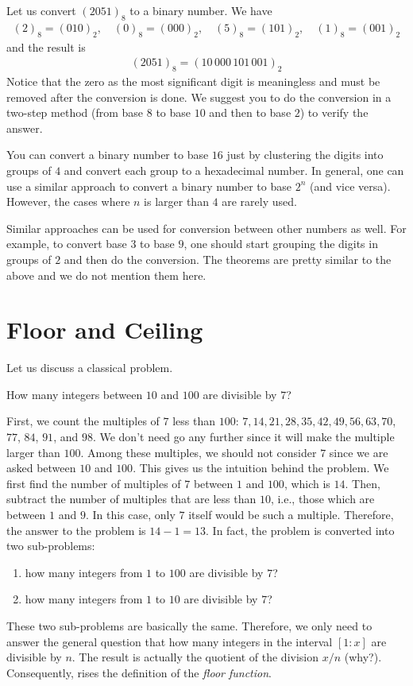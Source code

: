 \documentclass{subfile}
\begin{document}
	\begin{example}
		Let us convert $(2051)_8$ to a binary number. We have
		\begin{align*}
			(2)_8=(\textit{010})_2, \quad (0)_8=(\textit{000})_2, \quad (5)_8=(\textit{101})_2, \quad (1)_8=(\textit{001})_2
		\end{align*}
		and the result is
		\begin{align*}
			(2051)_8 = (10\,000\,101\,001)_2
		\end{align*}
		Notice that the zero as the most significant digit is meaningless and must be removed after the conversion is done. We suggest you to do the conversion in a two-step method (from base $8$ to base $10$ and then to base $2$) to verify the answer.
	\end{example}
	You can convert a binary number to base $16$ just by clustering the digits into groups of $4$ and convert each group to a hexadecimal number. In general, one can use a similar approach to convert a binary number to base $2^n$ (and vice versa). However, the cases where $n$ is larger than $4$ are rarely used.

	Similar approaches can be used for conversion between other numbers as well. For example, to convert base $3$ to base $9$, one should start grouping the digits in groups of $2$ and then do the conversion. The theorems are pretty similar to the above and we do not mention them here.
\section{Floor and Ceiling}
Let us discuss a classical problem.
\begin{problem} \label{floorproblem}
	How many integers between $10$ and $100$ are divisible by $7$?
\end{problem}
First, we count the multiples of $7$ less than $100$: $7, 14, 21, 28, 35, 42, 49, 56, 63, 70$, $77$, $84$, $91$, and $98$. We don't need go any further since it will make the multiple larger than $100$. Among these multiples, we should not consider $7$ since we are asked between $10$ and $100$. This gives us the intuition behind the problem. We first find the number of multiples of $7$ between $1$ and $100$, which is $14$. Then, subtract the number of multiples that are less than $10$, i.e., those which are between $1$ and $9$. In this case, only $7$ itself would be such a multiple. Therefore, the answer to the problem is $14-1=13$. In fact, the problem is converted into two sub-problems:
\begin{enumerate}
	\item how many integers from $1$ to $100$ are divisible by $7$?
	\item how many integers from $1$ to $10$ are divisible by $7$?
\end{enumerate}
These two sub-problems are basically the same. Therefore, we only need to answer the general question that how many integers in the interval $[1:x]$ are divisible by $n$. The result is actually the quotient of the division $x/n$ (why?). Consequently, rises the definition of the \textit{floor function}.
\end{document}
